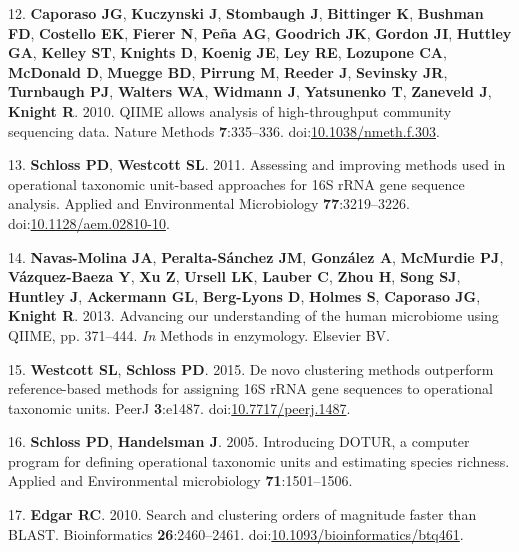 \documentclass[11pt,]{article}
\begin{document}
\hypertarget{ref-Caporaso2010}{}
12. \textbf{Caporaso JG}, \textbf{Kuczynski J}, \textbf{Stombaugh J},
\textbf{Bittinger K}, \textbf{Bushman FD}, \textbf{Costello EK},
\textbf{Fierer N}, \textbf{Peña AG}, \textbf{Goodrich JK},
\textbf{Gordon JI}, \textbf{Huttley GA}, \textbf{Kelley ST},
\textbf{Knights D}, \textbf{Koenig JE}, \textbf{Ley RE},
\textbf{Lozupone CA}, \textbf{McDonald D}, \textbf{Muegge BD},
\textbf{Pirrung M}, \textbf{Reeder J}, \textbf{Sevinsky JR},
\textbf{Turnbaugh PJ}, \textbf{Walters WA}, \textbf{Widmann J},
\textbf{Yatsunenko T}, \textbf{Zaneveld J}, \textbf{Knight R}. 2010.
QIIME allows analysis of high-throughput community sequencing data.
Nature Methods \textbf{7}:335--336.
doi:\href{https://doi.org/10.1038/nmeth.f.303}{10.1038/nmeth.f.303}.

\hypertarget{ref-Schloss2011}{}
13. \textbf{Schloss PD}, \textbf{Westcott SL}. 2011. Assessing and
improving methods used in operational taxonomic unit-based approaches
for 16S rRNA gene sequence analysis. Applied and Environmental
Microbiology \textbf{77}:3219--3226.
doi:\href{https://doi.org/10.1128/aem.02810-10}{10.1128/aem.02810-10}.

\hypertarget{ref-NavasMolina2013}{}
14. \textbf{Navas-Molina JA}, \textbf{Peralta-Sánchez JM},
\textbf{González A}, \textbf{McMurdie PJ}, \textbf{Vázquez-Baeza Y},
\textbf{Xu Z}, \textbf{Ursell LK}, \textbf{Lauber C}, \textbf{Zhou H},
\textbf{Song SJ}, \textbf{Huntley J}, \textbf{Ackermann GL},
\textbf{Berg-Lyons D}, \textbf{Holmes S}, \textbf{Caporaso JG},
\textbf{Knight R}. 2013. Advancing our understanding of the human
microbiome using QIIME, pp. 371--444. \emph{In} Methods in enzymology.
Elsevier BV.

\hypertarget{ref-Westcott2015}{}
15. \textbf{Westcott SL}, \textbf{Schloss PD}. 2015. De novo clustering
methods outperform reference-based methods for assigning 16S rRNA gene
sequences to operational taxonomic units. PeerJ \textbf{3}:e1487.
doi:\href{https://doi.org/10.7717/peerj.1487}{10.7717/peerj.1487}.

\hypertarget{ref-Schloss2005}{}
16. \textbf{Schloss PD}, \textbf{Handelsman J}. 2005. Introducing DOTUR,
a computer program for defining operational taxonomic units and
estimating species richness. Applied and Environmental microbiology
\textbf{71}:1501--1506.

\hypertarget{ref-Edgar2010}{}
17. \textbf{Edgar RC}. 2010. Search and clustering orders of magnitude
faster than BLAST. Bioinformatics \textbf{26}:2460--2461.
doi:\href{https://doi.org/10.1093/bioinformatics/btq461}{10.1093/bioinformatics/btq461}.
\end{document}
